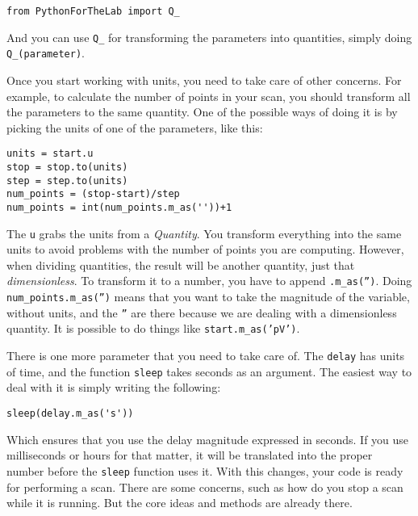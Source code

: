 {\begin{verbatim}
from PythonForTheLab import Q_
\end{verbatim}

And you can use \texttt{Q_} for transforming the parameters into
quantities, simply doing \texttt{Q_(parameter)}.


Once you start working with units, you need to take care of other
concerns. For example, to calculate the number of points in your scan,
you should transform all the parameters to the same quantity. One of the
possible ways of doing it is by picking the units of one of the
parameters, like this:

\begin{verbatim}
units = start.u
stop = stop.to(units)
step = step.to(units)
num_points = (stop-start)/step
num_points = int(num_points.m_as(''))+1
\end{verbatim}

The \texttt{u} grabs the units from a \emph{Quantity}. You transform
everything into the same units to avoid problems with the number of
points you are computing. However, when dividing quantities, the result
will be another quantity, just that \emph{dimensionless}. To transform
it to a number, you have to append
\texttt{.m_as('')}. Doing
\texttt{num_points.m_as('')} means
that you want to take the magnitude of the variable, without units, and
the \texttt{''} are there because we
are dealing with a dimensionless quantity. It is possible to do things
like \texttt{start.m_as('pV')}.

There is one more parameter that you need to take care of. The
\texttt{delay} has units of time, and the function \texttt{sleep} takes
seconds as an argument. The easiest way to deal with it is simply
writing the following:

\begin{verbatim}
sleep(delay.m_as('s'))
\end{verbatim}

Which ensures that you use the delay magnitude expressed in seconds. If
you use milliseconds or hours for that matter, it will be translated
into the proper number before the \texttt{sleep} function uses it. With
this changes, your code is ready for performing a scan. There are some
concerns, such as how do you stop a scan while it is running. But the
core ideas and methods are already there.

}
